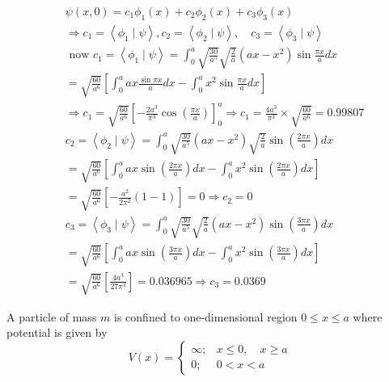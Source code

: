 \begin{enumerate}
\begin{answer}
	\begin{align*}
		&\psi(x, 0)=c_{1} \phi_{1}(x)+c_{2} \phi_{2}(x)+c_{3} \phi_{3}(x) \\
		&\Rightarrow c_{1}=\left\langle\phi_{1} \mid \psi\right\rangle, c_{2}=\left\langle\phi_{2} \mid \psi\right\rangle, \quad c_{3}=\left\langle\phi_{3} \mid \psi\right\rangle\\
		&\text { now } c_{1}=\left\langle\phi_{1} \mid \psi\right\rangle=\int_{0}^{a} \sqrt{\frac{30}{a^{5}}} \sqrt{\frac{2}{a}}\left(a x-x^{2}\right) \sin \frac{\pi x}{a} d x \\
		&=\sqrt{\frac{60}{a^{6}}}\left[\int_{0}^{a} a x \frac{\sin \pi x}{a} d x-\int_{0}^{a} x^{2} \sin \frac{\pi x}{a} d x\right] \\
		&\Rightarrow c_{1}=\sqrt{\frac{60}{a^{6}}}\left[-\frac{2 a^{3}}{\pi^{3}} \cos \left(\frac{\pi x}{a}\right)\right]_{0}^{a} \Rightarrow c_{1}=\frac{4 a^{3}}{\pi^{3}} \times \sqrt{\frac{60}{a^{6}}}=0.99807\\
		&c_{2}=\left\langle\phi_{2} \mid \psi\right\rangle=\int_{0}^{a} \sqrt{\frac{30}{a^{5}}}\left(a x-x^{2}\right) \sqrt{\frac{2}{a}} \sin \left(\frac{2 \pi x}{a}\right) d x \\
		&=\sqrt{\frac{60}{a^{6}}}\left[\int_{0}^{a} a x \sin \left(\frac{2 \pi x}{a}\right) d x-\int_{0}^{a} x^{2} \sin \left(\frac{2 \pi x}{a}\right) d x\right] \\
		&=\sqrt{\frac{60}{a^{6}}}\left[-\frac{a^{2}}{2 \pi^{2}}(1-1)\right]=0 \Rightarrow c_{2}=0\\
		&c_{3}=\left\langle\phi_{3} \mid \psi\right\rangle=\int_{0}^{a} \sqrt{\frac{30}{a^{5}}} \sqrt{\frac{2}{a}}\left(a x-x^{2}\right) \sin \left(\frac{3 \pi x}{a}\right) d x \\
		&=\sqrt{\frac{60}{a^{6}}}\left[\int_{0}^{a} a x \sin \left(\frac{3 \pi x}{a}\right) d x-\int_{0}^{a} x^{2} \sin \left(\frac{3 \pi x}{a}\right) d x\right] \\
		&=\sqrt{\frac{60}{a^{6}}}\left[\frac{4 a^{3}}{27 \pi^{3}}\right]=0.036965 \Rightarrow c_{3}=0.0369
	\end{align*}
\end{answer}
	\begin{minipage}{\textwidth}
	\item A particle of mass $m$ is confined to one-dimensional region $0 \leq x \leq a$ where potential is given by
	$$
	V(x)= \begin{cases}\infty ; & x \leq 0, \quad x \geq a \\ 0 ; & 0<x<a\end{cases}
$$
\end{minipage}
\end{enumerate}
